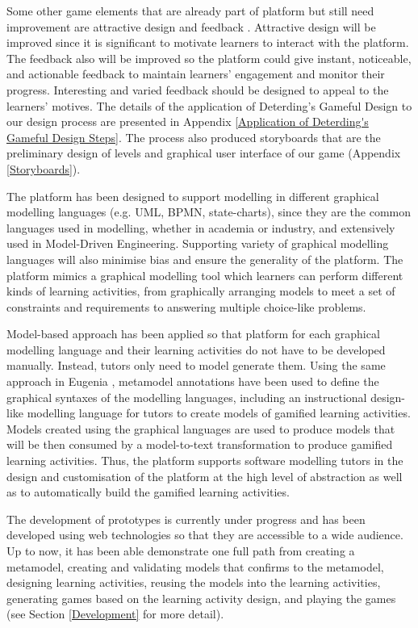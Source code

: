 \documentclass[12pt, a4paper]{report} \usepackage[titletoc]{appendix}
\begin{document}
Some other game elements that are already part of platform but still need improvement are attractive design and feedback \cite{deterding2015lens}. Attractive design will be improved since it is significant to motivate learners to interact with the platform. The feedback also will be improved so the platform could give instant, noticeable, and actionable feedback to maintain learners' engagement and monitor their progress. Interesting and varied feedback should be designed to appeal to the learners' motives. The details of the application of Deterding's Gameful Design to our design process are presented in Appendix \ref{Application of Deterding's Gameful Design Steps}. The process also produced storyboards that are the preliminary design of levels and graphical user interface of our game (Appendix \ref{Storyboards}). 

The platform has been designed to support modelling in different graphical modelling languages (e.g. UML, BPMN, state-charts), since they are the common languages used in modelling, whether in academia or industry, and extensively used in Model-Driven Engineering. Supporting variety of graphical modelling languages will also minimise bias and ensure the generality of the platform. The platform mimics a graphical modelling tool which learners can perform different kinds of learning activities, from graphically arranging models to meet a set of constraints and requirements to answering multiple choice-like problems.

Model-based approach has been applied so that platform for each graphical modelling language and their learning activities do not have to be developed manually. Instead, tutors only need to model generate them. Using the same approach in Eugenia \cite{kolovos2015eugenia}, metamodel annotations have been used to define the graphical syntaxes of the modelling languages, including an instructional design-like modelling language for tutors to create models of gamified learning activities. Models created using the graphical languages are used to produce models that will be then consumed by a model-to-text transformation to produce gamified learning activities. Thus, the platform supports software modelling tutors in the design and customisation of the platform at the high level of abstraction as well as to automatically build the gamified learning activities. 

The development of prototypes is currently under progress and has been developed using web technologies so that they are accessible to a wide audience. Up to now, it has been able demonstrate one full path from creating a metamodel, creating and validating models that confirms to the metamodel, designing learning activities, reusing the models into the learning activities, generating games based on the learning activity design, and playing the games (see Section \ref{Development} for more detail). 
\end{document}
